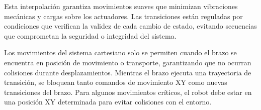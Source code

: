 Esta interpolación garantiza movimientos suaves que minimizan vibraciones mecánicas y cargas sobre los actuadores. Las transiciones están reguladas por condiciones que verifican la validez de cada cambio de estado, evitando secuencias que comprometan la seguridad o integridad del sistema. 

Los movimientos del sistema cartesiano solo se permiten cuando el brazo se encuentra en posición de movimiento o transporte, garantizando que no ocurran colisiones durante desplazamientos. Mientras el brazo ejecuta una trayectoria de transición, se bloquean tanto comandos de movimiento XY como nuevas transiciones del brazo. Para algunos movimientos críticos, el robot debe estar en una posición XY determinada para evitar colisiones con el entorno.